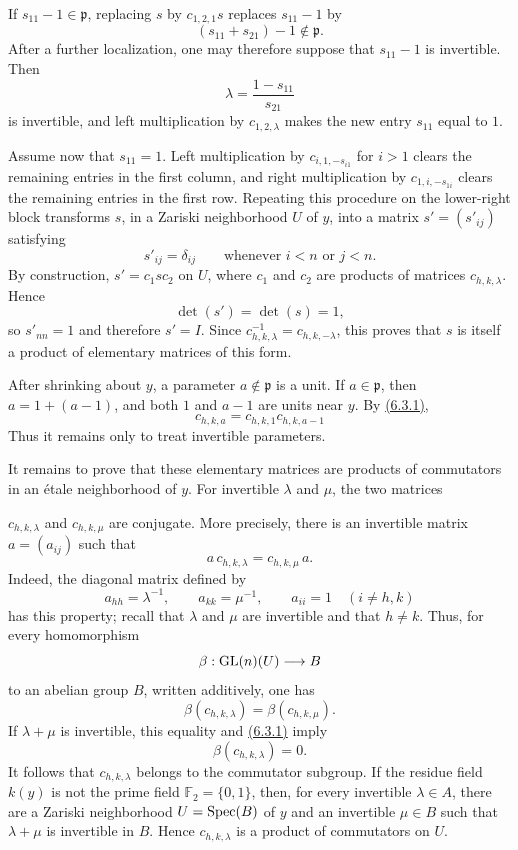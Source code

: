 If $s_{11}-1\in\mathfrak p$, replacing $s$ by $c_{1,2,1}s$ replaces
$s_{11}-1$ by
\[
(s_{11}+s_{21})-1\notin\mathfrak p.
\]
After a further localization, one may therefore suppose that $s_{11}-1$ is
invertible. Then
\[
\lambda=\frac{1-s_{11}}{s_{21}}
\]
is invertible, and left multiplication by $c_{1,2,\lambda}$ makes the new
entry $s_{11}$ equal to $1$.

Assume now that $s_{11}=1$. Left multiplication by
$c_{i,1,-s_{i1}}$ for $i>1$ clears the remaining entries in the first
column, and right multiplication by $c_{1,i,-s_{1i}}$ clears the remaining
entries in the first row. Repeating this procedure on the lower-right block
transforms $s$, in a Zariski neighborhood $U$ of $y$, into a matrix
$s'=(s'_{ij})$ satisfying
\[
s'_{ij}=\delta_{ij}\qquad\text{whenever }i<n\text{ or }j<n.
\]
By construction, $s'=c_1sc_2$ on $U$, where $c_1$ and $c_2$ are products
of matrices $c_{h,k,\lambda}$. Hence
\[
\det(s')=\det(s)=1,
\]
so $s'_{nn}=1$ and therefore $s'=I$. Since
$c_{h,k,\lambda}^{-1}=c_{h,k,-\lambda}$, this proves that $s$ is itself a
product of elementary matrices of this form.

After shrinking about $y$, a parameter $a\notin\mathfrak p$ is a unit. If
$a\in\mathfrak p$, then $a=1+(a-1)$, and both $1$ and $a-1$ are units near
$y$. By \hyperlink{sga6.e10.eq.6-3-1}{(6.3.1)},
\[
c_{h,k,a}=c_{h,k,1}c_{h,k,a-1}
\]
Thus it remains only to treat invertible parameters.

It remains to prove that these elementary matrices are products of
commutators in an \'etale neighborhood of $y$. For invertible $\lambda$ and
$\mu$, the two matrices

$c_{h,k,\lambda}$ and $c_{h,k,\mu}$ are conjugate. More precisely, there is
an invertible matrix $a=(a_{ij})$ such that
\[
a\,c_{h,k,\lambda}=c_{h,k,\mu}\,a.
\]
Indeed, the diagonal matrix defined by
\[
a_{hh}=\lambda^{-1},\qquad a_{kk}=\mu^{-1},\qquad
a_{ii}=1\quad(i\ne h,k)
\]
has this property; recall that $\lambda$ and $\mu$ are invertible and that
$h\ne k$. Thus, for every homomorphism
\[
\beta:\operatorname{GL}(n)(U)\longrightarrow B
\]
to an abelian group $B$, written additively, one has
\[
\beta(c_{h,k,\lambda})=\beta(c_{h,k,\mu}).
\]
If $\lambda+\mu$ is invertible, this equality and \hyperlink{sga6.e10.eq.6-3-1}{(6.3.1)} imply
\[
\beta(c_{h,k,\lambda})=0.
\]
It follows that $c_{h,k,\lambda}$ belongs to the commutator subgroup. If the
residue field $k(y)$ is not the prime field $\mathbb F_2=\{0,1\}$, then,
for every invertible $\lambda\in A$, there are a Zariski neighborhood
$U=\operatorname{Spec}(B)$ of $y$ and an invertible $\mu\in B$ such that
$\lambda+\mu$ is invertible in $B$. Hence $c_{h,k,\lambda}$ is a product
of commutators on $U$.

